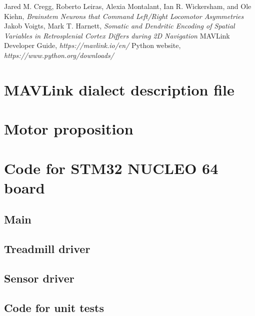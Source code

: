 \documentclass[12pt,a4paper, twoside]{article}
\begin{document}
\newpage
\lhead{ }
\begin{thebibliography}{100}
	
	Jared M. Cregg, Roberto Leiras, Alexia Montalant, Ian R. Wickersham, and Ole Kiehn, \textit{Brainstem Neurons that Command Left/Right Locomotor Asymmetries} 
	 Jakob Voigts, Mark T. Harnett, \textit{Somatic and Dendritic Encoding of Spatial Variables in Retrosplenial Cortex Differs during 2D Navigation}
	 MAVLink Developer Guide, \textit{https://mavlink.io/en/}
	 Python website, \textit{https://www.python.org/downloads/}
	
	
\end{thebibliography}

\listoffigures
\listoftables
\appendix
\section{MAVLink dialect description file}\label{app:mavlink}

\section{Motor proposition}\label{app:motor}

\section{Code for STM32 NUCLEO 64 board}
\subsection{Main}


\subsection{Treadmill driver}


\subsection{Sensor driver}


\subsection{Code for unit tests}








\end{document}
